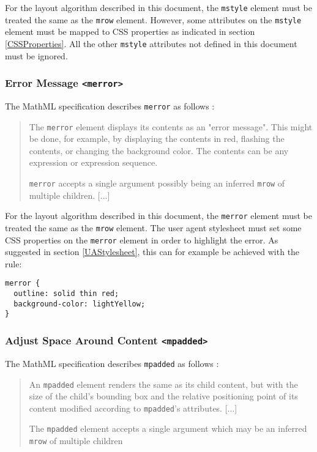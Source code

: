 For the layout algorithm described in this document, the
{\tt mstyle} element must be treated the same as the {\tt mrow} element.
However, some attributes on the {\tt mstyle} element must be mapped to CSS
properties as indicated in section \ref{CSSProperties}.
All the other {\tt mstyle}
attributes not defined in this document must be ignored.

\subsubsection{Error Message {\tt <merror>}}

The MathML specification describes {\tt merror} as follows \cite{MathML3}:
%
\begin{quote}
The {\tt merror} element displays its contents as an "error message". This
might be done, for example, by displaying the contents in red, flashing the
contents, or changing the background color. The contents can be any expression
or expression sequence.

{\tt merror} accepts a single argument possibly being an inferred {\tt mrow} of
multiple children. [...]
\end{quote}

For the layout algorithm described in this document, the
{\tt merror} element must be treated the same as the {\tt mrow} element.
The user agent stylesheet must set some CSS properties on the {\tt merror}
element in order to highlight the error.
As suggested in section \ref{UAStylesheet}, this can for example be achieved
with the rule:
%
\begin{lstlisting}
merror {
  outline: solid thin red;
  background-color: lightYellow;
}
\end{lstlisting}

\subsubsection{Adjust Space Around Content {\tt <mpadded>}}\label{mpadded}

The MathML specification describes {\tt mpadded} as follows \cite{MathML3}:
%
\begin{quote}
An {\tt mpadded} element renders the same as its child content, but with the
size of the child's bounding box and the relative positioning point of its
content modified according to {\tt mpadded}'s attributes. [...]

The {\tt mpadded} element accepts a single argument which may be an inferred
{\tt mrow} of multiple children
\end{quote}

